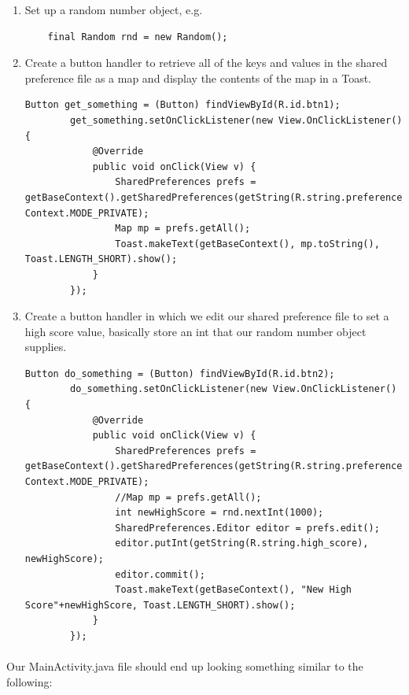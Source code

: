 \documentclass[12pt, a4paper, twoside]{book}
\begin{document}
\begin{enumerate}
\item Set up a random number object, e.g.
\begin{lstlisting}
    final Random rnd = new Random();
\end{lstlisting}
\item Create a button handler to retrieve all of the keys and values in the shared preference file as a map and display the contents of the map in a Toast.
\begin{lstlisting}
Button get_something = (Button) findViewById(R.id.btn1);
        get_something.setOnClickListener(new View.OnClickListener() {
            @Override
            public void onClick(View v) {
                SharedPreferences prefs = getBaseContext().getSharedPreferences(getString(R.string.preference_file_name), Context.MODE_PRIVATE);
                Map mp = prefs.getAll();
                Toast.makeText(getBaseContext(), mp.toString(), Toast.LENGTH_SHORT).show();
            }
        });
\end{lstlisting}
\item Create a button handler in which we edit our shared preference file to set a high score value, basically store an int that our random number object supplies.
\begin{lstlisting}
Button do_something = (Button) findViewById(R.id.btn2);
        do_something.setOnClickListener(new View.OnClickListener() {
            @Override
            public void onClick(View v) {
                SharedPreferences prefs = getBaseContext().getSharedPreferences(getString(R.string.preference_file_name), Context.MODE_PRIVATE);
                //Map mp = prefs.getAll();
                int newHighScore = rnd.nextInt(1000);
                SharedPreferences.Editor editor = prefs.edit();
                editor.putInt(getString(R.string.high_score), newHighScore);
                editor.commit();
                Toast.makeText(getBaseContext(), "New High Score"+newHighScore, Toast.LENGTH_SHORT).show();
            }
        });
\end{lstlisting}
\end{enumerate}

\paragraph{} Our MainActivity.java file should end up looking something similar to the following:
\end{document}
